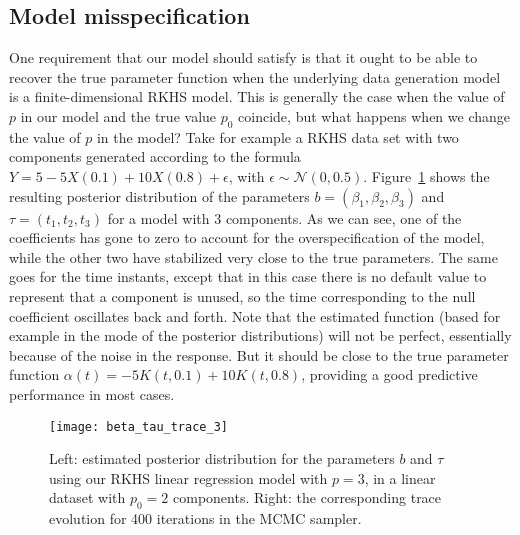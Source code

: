 \subsection{Model misspecification}

One requirement that our model should satisfy is that it ought to be able to recover the true parameter function when the underlying data generation model is a finite-dimensional RKHS model. This is generally the case when the value of \(p\) in our model and the true value \(p_0\) coincide, but what happens when we change the value of \(p\) in the model? Take for example a RKHS data set with two components generated according to the formula \(Y=5 -5X(0.1) + 10X(0.8) + \epsilon\), with \(\epsilon\sim \mathcal N(0, 0.5)\). Figure~\ref{fig:beta_tau_trace_3} shows the resulting posterior distribution of the parameters \(b=(\beta_1, \beta_2, \beta_3)\) and \(\tau=(t_1, t_2, t_3)\) for a model with 3 components. As we can see, one of the coefficients has gone to zero to account for the overspecification of the model, while the other two have stabilized very close to the true parameters. The same goes for the time instants, except that in this case there is no default value to represent that a component is unused, so the time corresponding to the null coefficient oscillates back and forth. Note that the estimated function (based for example in the mode of the posterior distributions) will not be perfect, essentially because of the noise in the response. But it should be close to the true parameter function \(\alpha(t)=-5K(t, 0.1) + 10K(t, 0.8)\), providing a good predictive performance in most cases.

\begin{figure}[ht!]
    \centering
    \texttt{[image: beta\_tau\_trace\_3]}
    \caption{Left: estimated posterior distribution for the parameters \(b\) and \(\tau\) using our RKHS linear regression model with \(p=3\), in a linear dataset with \(p_0=2\) components. Right: the corresponding trace evolution for 400 iterations in the MCMC sampler.}\label{fig:beta_tau_trace_3}
\end{figure}

